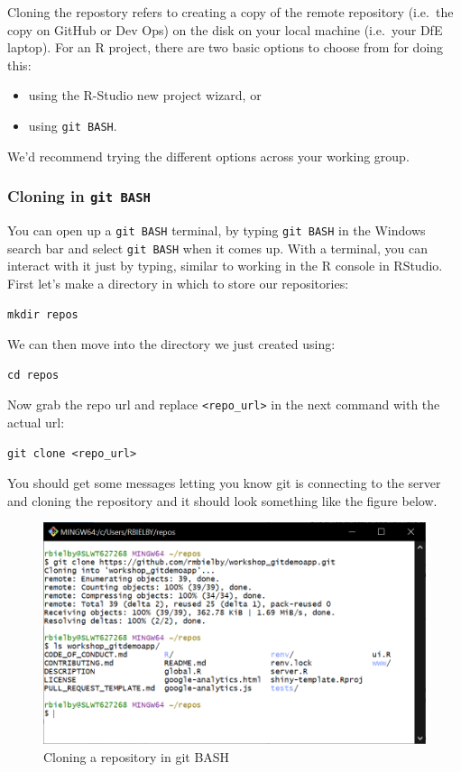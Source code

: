 \documentclass[
  12pt,
]{article}
\providecommand{\tightlist}{%
  \setlength{\itemsep}{0pt}\setlength{\parskip}{0pt}}
\begin{document}
Cloning the repostory refers to creating a copy of the remote repository
(i.e.~the copy on GitHub or Dev Ops) on the disk on your local machine
(i.e.~your DfE laptop). For an R project, there are two basic options to
choose from for doing this:

\begin{itemize}
\tightlist
\item
  using the R-Studio new project wizard, or
\item
  using \texttt{git\ BASH}.
\end{itemize}

We'd recommend trying the different options across your working group.

\hypertarget{cloning-in-git-bash}{%
\subsubsection{\texorpdfstring{Cloning in
\texttt{git\ BASH}}{Cloning in git BASH}}\label{cloning-in-git-bash}}

You can open up a \texttt{git\ BASH} terminal, by typing
\texttt{git\ BASH} in the Windows search bar and select
\texttt{git\ BASH} when it comes up. With a terminal, you can interact
with it just by typing, similar to working in the R console in RStudio.
First let's make a directory in which to store our repositories:

\begin{verbatim}
mkdir repos
\end{verbatim}

We can then move into the directory we just created using:

\begin{verbatim}
cd repos
\end{verbatim}

Now grab the repo url and replace
\texttt{\textless{}repo\_url\textgreater{}} in the next command with the
actual url:

\begin{verbatim}
git clone <repo_url>
\end{verbatim}

You should get some messages letting you know git is connecting to the
server and cloning the repository and it should look something like the
figure below.

\begin{figure}
\includegraphics[width=0.6\linewidth]{images/gitdemo/gitdemo-terminal_clone} \caption{Cloning a repository in git BASH}\label{fig:unnamed-chunk-4}
\end{figure}
\end{document}

